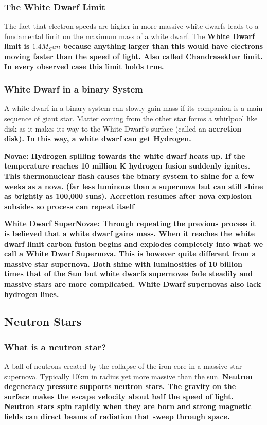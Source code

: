 \subsubsection{The White Dwarf Limit}
The fact that electron speeds are higher in more massive white dwarfs leads to a fundamental limit on the maximum mass of a white dwarf. The \bf{White Dwarf limit} is \bf{$1.4M_Sun$} because anything larger than this would have electrons moving faster than the speed of light. Also called Chandrasekhar limit. In every observed case this limit holds true.

\subsubsection{White Dwarf in a binary System}
A white dwarf in a binary system can slowly gain mass if its companion is a main sequence of giant star. Matter coming from the other star forms a whirlpool like disk as it makes its way to the White Dwarf's surface (called an \bf{accretion disk}). In this way, a white dwarf can get Hydrogen.

\bf{Novae}: Hydrogen spilling towards the white dwarf heats up. If the temperature reaches 10 million K hydrogen fusion suddenly ignites. This thermonuclear flash causes the binary system to shine for a few weeks as a nova. (far less luminous than a supernova but can still shine as brightly as 100,000 suns). Accretion resumes after nova explosion subsides so process can repeat itself

\bf{White Dwarf SuperNovae}: Through repeating the previous process it is believed that a white dwarf gains mass. When it reaches the \bf{white dwarf limit} carbon fusion begins and explodes completely into what we call a \bf{White Dwarf Supernova}. This is however quite different from a \bf{massive star supernova}. Both shine with luminosities of 10 billion times that of the Sun but white dwarfs supernovas fade steadily and massive stars are more complicated. White Dwarf supernovas also lack hydrogen lines.

\subsection{Neutron Stars}
\subsubsection{What is a neutron star?}
A ball of neutrons created by the collapse of the iron core in a massive star supernova. Typically 10km in radius yet more massive than the sun. \bf{Neutron degeneracy pressure} supports neutron stars. The gravity on the surface makes the escape velocity about half the speed of light. Neutron stars spin rapidly when they are born and strong magnetic fields can direct beams of radiation that sweep through space.

